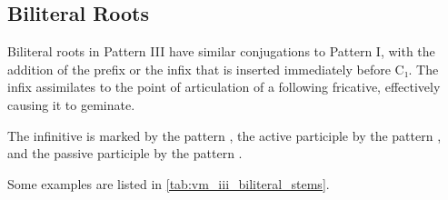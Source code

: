 \documentclass[grammar]{subfiles}
\begin{document}
\subsection{Biliteral Roots}
\label{ssec:vm_iii_biliteral}

Biliteral roots in Pattern III have similar conjugations to Pattern I, with the
addition of the prefix  or the infix  that is inserted immediately before
C₁.  The infix assimilates to the point of articulation of a following
fricative, effectively causing it to geminate. 

The infinitive is marked by the pattern , the active participle by the
pattern , and the passive participle by the pattern .  

Some examples are listed in \cref{tab:vm_iii_biliteral_stems}. 

\begin{table}[h!]\small\capstart
  \centering
  \\
  \caption{Pattern III biliteral stems \label{tab:vm_iii_biliteral_stems}}
\end{table}
\end{document}
